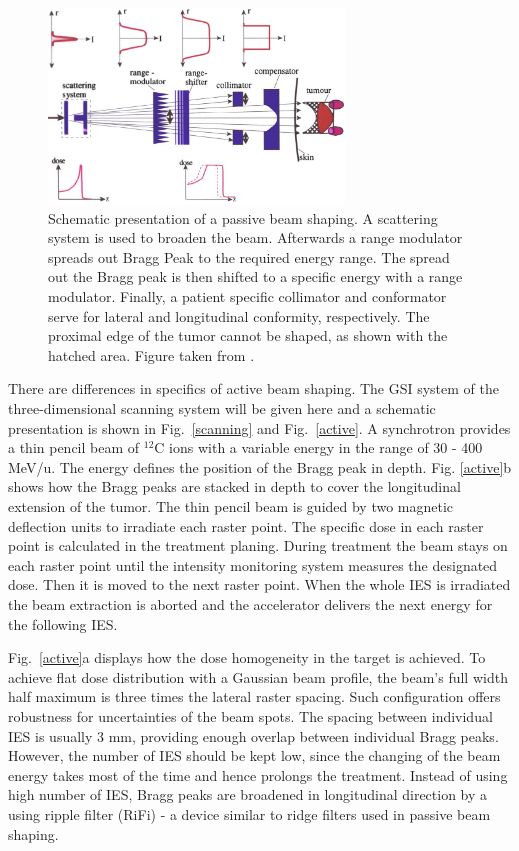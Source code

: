 \begin{figure}[H]
\begin{center}
\includegraphics[width=0.7\textwidth]{./Fundamentals/Images/deliverypassive.png}
\caption{Schematic presentation of a passive beam shaping. A scattering system is used to broaden the beam. Afterwards a range modulator spreads out Bragg Peak to the required energy range.
The spread out the Bragg peak is then shifted to a specific energy with a range modulator. Finally, a patient specific collimator and conformator serve for lateral and longitudinal conformity, respectively.
The proximal edge of the tumor cannot be shaped, as shown with the hatched area. Figure taken from \cite{Schardt2010}.}
\label{passive}
\end{center}
\end{figure}

There are differences in specifics of active beam shaping. The GSI system of the three-dimensional scanning system will be given here \cite{Haberer1993,Kraft2000,Schardt2010} and a schematic presentation is shown in Fig.~\ref{scanning} and Fig.~\ref{active}.
A synchrotron provides a thin pencil beam of $^{12}$C ions with a variable energy in the range of 30 - 400 MeV/u. The energy defines the position of the Bragg peak in depth. Fig. \ref{active}b shows how the Bragg peaks are stacked in depth to cover the longitudinal extension of the tumor.
The thin pencil beam is guided by two magnetic deflection units to irradiate each raster point. The specific dose in each raster point is calculated in the treatment planing.
During treatment the beam stays on each raster point until the intensity monitoring system measures the designated dose. Then it is moved to the next raster point. When the whole IES is irradiated the beam extraction is aborted and the accelerator delivers
the next energy for the following IES.

Fig.~\ref{active}a displays how the dose homogeneity in the target is achieved. To achieve flat dose distribution with a Gaussian beam profile, the beam's full width half maximum is three times the lateral raster spacing. Such configuration offers robustness for uncertainties of the beam spots.
The spacing between individual IES is usually 3 mm, providing enough overlap between individual Bragg peaks. However, the number of IES should be kept low, since the changing of the beam energy takes most of the time and hence prolongs the treatment. Instead of using high number of
 IES, Bragg peaks are broadened in longitudinal direction by a using ripple filter (RiFi) - a device similar to ridge filters used in passive beam shaping. 



